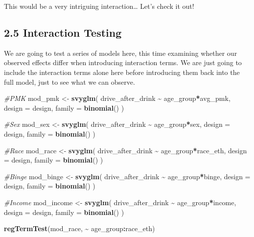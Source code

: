 \documentclass[
]{article}
\newenvironment{Shaded}{\begin{snugshade}}{\end{snugshade}}
\newcommand{\AttributeTok}[1]{\textcolor[rgb]{0.13,0.29,0.53}{#1}}
\newcommand{\CommentTok}[1]{\textcolor[rgb]{0.56,0.35,0.01}{\textit{#1}}}
\newcommand{\FunctionTok}[1]{\textcolor[rgb]{0.13,0.29,0.53}{\textbf{#1}}}
\newcommand{\NormalTok}[1]{#1}
\newcommand{\OtherTok}[1]{\textcolor[rgb]{0.56,0.35,0.01}{#1}}
\newcommand{\SpecialCharTok}[1]{\textcolor[rgb]{0.81,0.36,0.00}{\textbf{#1}}}
\begin{document}
This would be a very intriguing interaction\ldots{} Let's check it out!

\subsection{2.5 Interaction Testing}\label{interaction-testing}

We are going to test a series of models here, this time examining
whether our observed effects differ when introducing interaction terms.
We are just going to include the interaction terms alone here before
introducing them back into the full model, just to see what we can
observe.

\begin{Shaded}
\begin{Highlighting}[]
\CommentTok{\#PMK }
\NormalTok{mod\_pmk }\OtherTok{\textless{}{-}} \FunctionTok{svyglm}\NormalTok{(}
\NormalTok{  drive\_after\_drink }\SpecialCharTok{\textasciitilde{}}\NormalTok{ age\_group}\SpecialCharTok{*}\NormalTok{avg\_pmk,}
  \AttributeTok{design =}\NormalTok{ design,}
  \AttributeTok{family =} \FunctionTok{binomial}\NormalTok{()}
\NormalTok{)}

\CommentTok{\#Sex }
\NormalTok{mod\_sex }\OtherTok{\textless{}{-}}  \FunctionTok{svyglm}\NormalTok{(}
\NormalTok{  drive\_after\_drink }\SpecialCharTok{\textasciitilde{}}\NormalTok{ age\_group}\SpecialCharTok{*}\NormalTok{sex,}
  \AttributeTok{design =}\NormalTok{ design,}
  \AttributeTok{family =} \FunctionTok{binomial}\NormalTok{()}
\NormalTok{)  }

\CommentTok{\#Race }
\NormalTok{ mod\_race }\OtherTok{\textless{}{-}} \FunctionTok{svyglm}\NormalTok{(}
\NormalTok{  drive\_after\_drink }\SpecialCharTok{\textasciitilde{}}\NormalTok{ age\_group}\SpecialCharTok{*}\NormalTok{race\_eth, }
  \AttributeTok{design =}\NormalTok{ design,}
  \AttributeTok{family =} \FunctionTok{binomial}\NormalTok{()}
\NormalTok{)  }
 
  
\CommentTok{\#Binge }
\NormalTok{ mod\_binge }\OtherTok{\textless{}{-}}   \FunctionTok{svyglm}\NormalTok{(}
\NormalTok{  drive\_after\_drink }\SpecialCharTok{\textasciitilde{}}\NormalTok{ age\_group}\SpecialCharTok{*}\NormalTok{binge,}
  \AttributeTok{design =}\NormalTok{ design,}
  \AttributeTok{family =} \FunctionTok{binomial}\NormalTok{()}
\NormalTok{)  }
 
\CommentTok{\#Income }
\NormalTok{ mod\_income }\OtherTok{\textless{}{-}} \FunctionTok{svyglm}\NormalTok{(}
\NormalTok{  drive\_after\_drink }\SpecialCharTok{\textasciitilde{}}\NormalTok{ age\_group}\SpecialCharTok{*}\NormalTok{income,}
  \AttributeTok{design =}\NormalTok{ design,}
  \AttributeTok{family =} \FunctionTok{binomial}\NormalTok{()}
\NormalTok{)  }

 \FunctionTok{regTermTest}\NormalTok{(mod\_race, }\SpecialCharTok{\textasciitilde{}}\NormalTok{ age\_group}\SpecialCharTok{:}\NormalTok{race\_eth)}
\end{Highlighting}
\end{Shaded}
\end{document}
